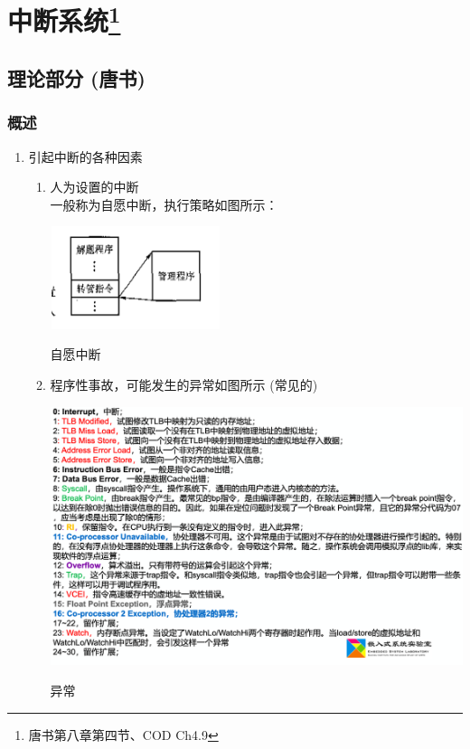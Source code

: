 \documentclass[]{report}
\begin{document}
	\chapter[]{中断系统\footnote{唐书第八章第四节、COD Ch4.9}}
		\section{理论部分 (唐书)}
			\subsection{概述}
				\begin{enumerate}
					\item 引起中断的各种因素\par
					\begin{enumerate}
						\item 人为设置的中断\\
						一般称为自愿中断，执行策略如图所示：\par
						\centerline{\includegraphics[height=3cm,width=5cm]{../pictures/Volunteer_Interrupt.png}}
						\centerline{自愿中断}\par
						\item 程序性事故，可能发生的异常如图所示 (常见的)\par
						\centerline{\includegraphics[scale = 0.2]{../pictures/Exceptions.png}}
						\centerline{异常}\par

\end{enumerate}
\end{enumerate}
\end{document}
